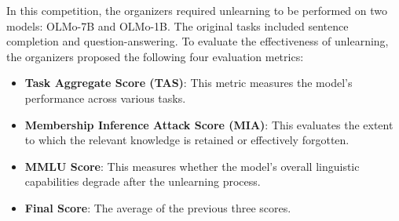 \documentclass[11pt]{article}
\begin{document}








In this competition, the organizers required unlearning to be performed on two models: OLMo-7B and OLMo-1B. The original tasks included sentence completion and question-answering. To evaluate the effectiveness of unlearning, the organizers proposed the following four evaluation metrics:
\begin{itemize}
	\item \textbf{Task Aggregate Score (TAS)}: This metric measures the model's performance across various tasks.
	\item \textbf{Membership Inference Attack Score (MIA)}: This evaluates the extent to which the relevant knowledge is retained or effectively forgotten.
	\item \textbf{MMLU Score}: This measures whether the model's overall linguistic capabilities degrade after the unlearning process.
	\item \textbf{Final Score}: The average of the previous three scores.
\end{itemize}
\end{document}
